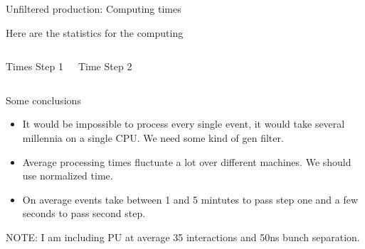 \documentclass[8pt]{beamer}
\begin{document}
\begin{frame}{Unfiltered production: Computing times}
 
Here are the statistics for the computing

\begin{columns}

  \centering

  \begin{block}{Times Step 1}
  
  \end{block}
  
  \centering
  
  \begin{block}{Time Step 2}
  
  \end{block}

\end{columns}
  
Some conclusions
\begin{itemize}
  \item It would be impossible to process every single event, it would take several millennia on a single CPU. We need some kind of gen filter.
  \item Average processing times fluctuate a lot over different machines. We should use normalized time.
  \item On average events take between 1 and 5 mintutes to pass step one and a few seconds to pass second step.
\end{itemize}

NOTE: I am including PU at average 35 interactions and 50ns bunch separation.

\end{frame}
\end{document}
